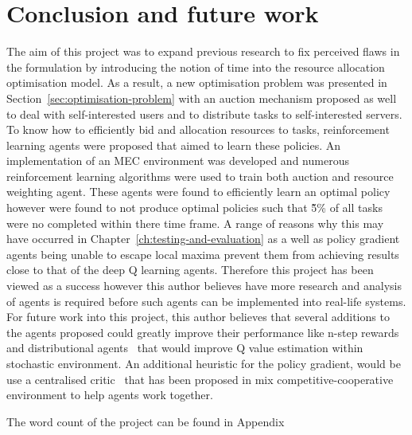 \chapter{Conclusion and future work}\label{ch:conclusion-and-future-work}
The aim of this project was to expand previous research to fix perceived flaws in the formulation by introducing the
notion of time into the resource allocation optimisation model. As a result, a new optimisation problem was presented
in Section~\ref{sec:optimisation-problem} with an auction mechanism proposed as well to deal with self-interested
users and to distribute tasks to self-interested servers. To know how to efficiently bid and allocation resources to
tasks, reinforcement learning agents were proposed that aimed to learn these policies. An implementation of an MEC
environment was developed and numerous reinforcement learning algorithms were used to train both auction and resource
weighting agent. These agents were found to efficiently learn an optimal policy however were found to not produce
optimal policies such that \~5\% of all tasks were no completed within there time frame. A range of reasons why this
may have occurred in Chapter~\ref{ch:testing-and-evaluation} as a well as policy gradient agents being unable to
escape local maxima prevent them from achieving results close to that of the deep Q learning agents. Therefore this
project has been viewed as a success however this author believes have more research and analysis of agents is required
before such agents can be implemented into real-life systems. \\
For future work into this project, this author believes that several additions to the agents proposed could greatly
improve their performance like n-step rewards~\citep{multi-step-dqn} and distributional agents~\citep{distributional_dqn}
that would improve Q value estimation within stochastic environment. An additional heuristic for the policy gradient,
would be use a centralised critic~\citep{maddpg} that has been proposed in mix competitive-cooperative environment to
help agents work together.

The word count of the project can be found in Appendix